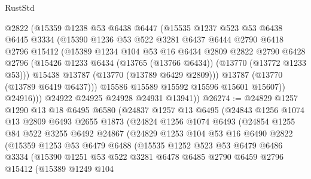 \begin{lexlean}{RustStd}
\begin{coremodule}
              @2822
              (@15359
                @1238
                @53
                @6438
                @6447
                (@15535
                  @1237
                  @523
                  @53
                  @6438
                  @6445
                  @3334
                  (@15390
                    @1236
                    @53
                    @522
                    @3281
                    @6437
                    @6444
                    @2790
                    @6418
                    @2796
                    @15412
                    (@15389
                      @1234
                      @104
                      @53
                      @16
                      @6434
                      @2809
                      @2822
                      @2790
                      @6428
                      @2796
                      (@15426 @1233 @6434 (@13765 (@13766 @6434)) (@13770 (@13772 @1233 @53)))
                      @15438
                      @13787
                      (@13770 (@13789 @6429 @2809)))
                    @13787
                    (@13770 (@13789 @6419 @6437)))
                  @15586
                  @15589
                  @15592
                  @15596
                  @15601
                  @15607))
              @24916)))
        @24922
        @24925
        @24928
        @24931
        @13941))
@26274 := @24829
    @1257
    @1290
    @13
    @18
    @6495
    @6580
    (@24837
      @1257
      @13
      @6495
      (@24843
        @1256
        @1074
        @13
        @2809
        @6493
        @2655
        @1873
        (@24824
          @1256
          @1074
          @6493
          (@24854
            @1255
            @84
            @522
            @3255
            @6492
            @24867
            (@24829
              @1253
              @104
              @53
              @16
              @6490
              @2822
              (@15359
                @1253
                @53
                @6479
                @6488
                (@15535
                  @1252
                  @523
                  @53
                  @6479
                  @6486
                  @3334
                  (@15390
                    @1251
                    @53
                    @522
                    @3281
                    @6478
                    @6485
                    @2790
                    @6459
                    @2796
                    @15412
                    (@15389
                      @1249
                      @104

\end{coremodule}
\end{lexlean}
